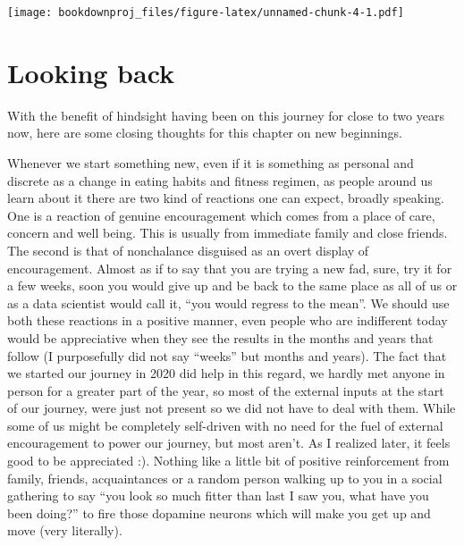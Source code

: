 \documentclass[
  oneside]{book}
\begin{document}
\texttt{[image: bookdownproj\_files/figure-latex/unnamed-chunk-4-1.pdf]}

\hypertarget{looking-back}{%
\section{Looking back}\label{looking-back}}

With the benefit of hindsight having been on this journey for close to two years now, here are some closing thoughts for this chapter on new beginnings.

Whenever we start something new, even if it is something as personal and discrete as a change in eating habits and fitness regimen, as people around us learn about it there are two kind of reactions one can expect, broadly speaking. One is a reaction of genuine encouragement which comes from a place of care, concern and well being. This is usually from immediate family and close friends. The second is that of nonchalance disguised as an overt display of encouragement. Almost as if to say that you are trying a new fad, sure, try it for a few weeks, soon you would give up and be back to the same place as all of us or as a data scientist would call it, ``you would regress to the mean''. We should use both these reactions in a positive manner, even people who are indifferent today would be appreciative when they see the results in the months and years that follow (I purposefully did not say ``weeks'' but months and years). The fact that we started our journey in 2020 did help in this regard, we hardly met anyone in person for a greater part of the year, so most of the external inputs at the start of our journey, were just not present so we did not have to deal with them. While some of us might be completely self-driven with no need for the fuel of external encouragement to power our journey, but most aren't. As I realized later, it feels good to be appreciated :). Nothing like a little bit of positive reinforcement from family, friends, acquaintances or a random person walking up to you in a social gathering to say ``you look so much fitter than last I saw you, what have you been doing?'' to fire those dopamine neurons which will make you get up and move (very literally).
\end{document}
